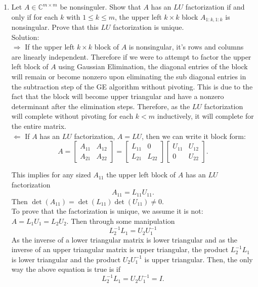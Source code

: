\documentclass[12pt]{article}
\numberwithin{equation}{section}
\newcommand{\A}{\mathcal{A}}
\begin{document}
\begin{enumerate}
\item Let $A\in\mathbb{C}^{m\times m}$ be nonsinguler. Show that $A$ has an $LU$ factorization if and only if for each $k$ with $1\leq k\leq m$, the upper left $k\times k$ block $A_{1:k,1:k}$ is nonsingular. Prove that this $LU$ factorization is unique.\\
    
    Solution:\\
    
    $\Rightarrow$ If the upper left $k\times k$ block of $A$ is nonsingular, it's rows and columns are linearly independent. Therefore if we were to attempt to factor the upper left block of $A$ using Gaussian Elimination, the diagonal entries of the block will remain or become nonzero upon eliminating the sub diagonal entries in the subtraction step of the GE algorithm without pivoting. This is due to the fact that the block will become upper triangular and have a nonzero determinant after the elimination steps. Therefore, as the $LU$ factorization will complete without pivoting for each $k<m$ inductively, it will complete for the entire matrix. \\ 
    $\Leftarrow$ If $A$ has an $LU$ factorization, $A=LU$, then we can write it block form:
    $$A=\left[\begin{array}{cc}A_{11}&A_{12}\\A_{21}&A_{22}\end{array}\right]=\left[\begin{array}{cc}L_{11}&0\\L_{21}&L_{22}\end{array}\right]\left[\begin{array}{cc}U_{11}&U_{12}\\0&U_{22}\end{array}\right].$$
    
    This implies for any sized $A_{11}$ the upper left block of $A$ has an $LU$ factorization 
    $$A_{11}=L_{11}U_{11}.$$
    Then $\det(A_{11})=\det(L_{11})\det(U_{11})\neq 0$.\\
    
    To prove that the factorization is unique, we assume it is not: $A=L_1U_1=L_2U_2$. 
    Then through some manipulation
    $$L_2^{-1}L_1=U_2U_1^{-1}$$
    As the inverse of a lower triangular matrix is lower triangular and as the inverse of an upper triangular matrix is upper triangular, the product $L_2^{-1}L_1$ is lower triangular and the product $U_2U_1^{-1}$ is upper triangular. Then, the only way the above equation is true is if  
    $$L_2^{-1}L_1=U_2U_1^{-1}=I.$$
    

\end{enumerate}
\end{document}
